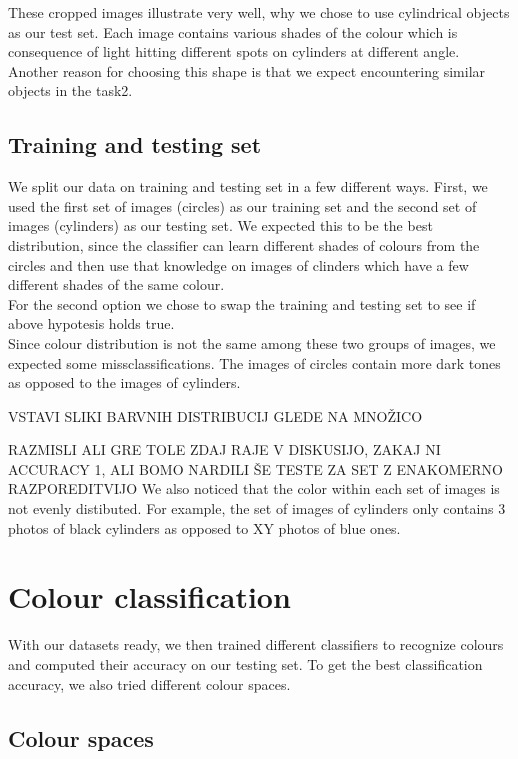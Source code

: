 \documentclass[12pt,a4paper]{article}
\begin{document}
	These cropped images illustrate very well, why we chose to use cylindrical objects as our test set. Each image contains various shades of the colour which is consequence of light hitting different spots on cylinders at different angle. Another reason for choosing this shape is that we expect encountering similar objects in the task2. 

	\subsection{Training and testing set}

	We split our data on training and testing set in a few different ways. First, we used the first set of images (circles) as our training set and the second set of images (cylinders) as our testing set. We expected this to be the best distribution, since the classifier can learn different shades of colours from the circles and then use that knowledge on images of clinders which have a few different shades of the same colour. \\

	For the second option we chose to swap the training and testing set to see if above hypotesis holds true.\\

	Since colour distribution is not the same among these two groups of images, we expected some missclassifications. The images of circles contain more dark tones as opposed to the images of cylinders.
	
	VSTAVI SLIKI BARVNIH DISTRIBUCIJ GLEDE NA MNOŽICO

	RAZMISLI ALI GRE TOLE ZDAJ RAJE V DISKUSIJO, ZAKAJ NI ACCURACY 1, ALI BOMO NARDILI ŠE TESTE ZA SET Z ENAKOMERNO RAZPOREDITVIJO
	We also noticed that the color within each set of images is not evenly distibuted. For example, the set of images of cylinders only contains 3 photos of black cylinders as opposed to XY photos of blue ones.
	
	\section{Colour classification}

	With our datasets ready, we then trained different classifiers to recognize colours and computed their accuracy on our testing set. To get the best classification accuracy, we also tried different colour spaces. 

	\subsection{Colour spaces}
\end{document}
